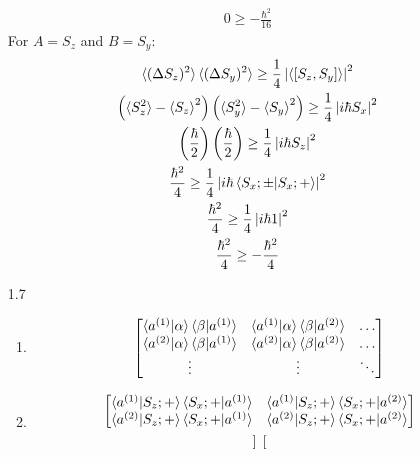 \documentclass[12pt]{article}
\begin{document}
\begin{enumerate}
\begin{gather*}
            0\geq-\frac{\hbar^2}{16}
        \end{gather*}
        For $A=S_z$ and $B=S_y$:
        \begin{gather*}
            \braket{(\Delta S_z)^2}\braket{(\Delta S_y)^2}\geq\frac{1}{4}\left|\braket{\left[S_z,S_y\right]}\right|^2\\
            \left(\braket{S_z^2}-\braket{S_z}^2\right)\left(\braket{S_y^2}-\braket{S_y}^2\right)\geq\frac{1}{4}\left|i\hbar S_x\right|^2\\
            \left(\frac{\hbar}{2}\right)
            \left(\frac{\hbar}{2}\right)
            \geq\frac{1}{4}\left|i\hbar S_z\right|^2\\
            \frac{\hbar^2}{4}\geq\frac{1}{4}\left|i\hbar \braket{S_x ;\pm|S_x ;+}\right|^2\\
            \frac{\hbar^2}{4}\geq\frac{1}{4}\left|i\hbar1\right|^2\\
            \frac{\hbar^2}{4}\geq-\frac{\hbar^2}{4}
        \end{gather*}
        \item[1.7]
        \begin{enumerate}
            \item
            \begin{gather*}
                \begin{bmatrix}
                    \braket{a^{(1)}|\alpha}\braket{\beta|a^{(1)}} & \braket{a^{(1)}|\alpha}\braket{\beta|a^{(2)}} & \ldots\\
                    \braket{a^{(2)}|\alpha}\braket{\beta|a^{(1)}} & \braket{a^{(2)}|\alpha}\braket{\beta|a^{(2)}} & \ldots\\
                    \vdots                                        & \vdots                                        & \ddots
                \end{bmatrix}
            \end{gather*}
            \item
            \begin{gather*}
                \begin{bmatrix}
                    \braket{a^{(1)}|S_z ;+}\braket{S_x ;+|a^{(1)}} & \braket{a^{(1)}|S_z ;+}\braket{S_x ;+|a^{(2)}} \\
                    \braket{a^{(2)}|S_z ;+}\braket{S_x ;+|a^{(1)}} & \braket{a^{(2)}|S_z ;+}\braket{S_x ;+|a^{(2)}}
                \end{bmatrix}\\
                \begin{bmatrix}

\end{bmatrix}
\end{gather*}
\end{enumerate}
\end{enumerate}
\end{document}
